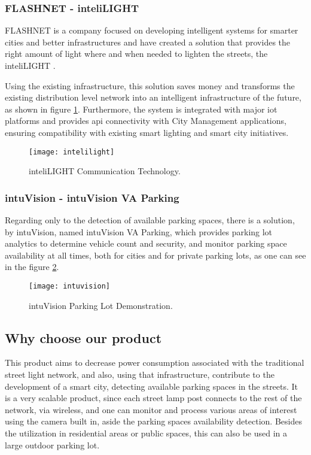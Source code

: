 \subsubsection{FLASHNET - inteliLIGHT}
FLASHNET is a company focused on developing intelligent systems for smarter cities and better infrastructures and have created a solution that provides the right amount of light where and when needed to lighten the streets, the inteliLIGHT \cite{inteli_light}.

Using the existing infrastructure, this solution saves money and transforms the existing distribution level network into an intelligent infrastructure of the future, as shown in figure \ref{fig:intelilight}. Furthermore, the system is integrated with major \ac{iot} platforms and provides \ac{api} connectivity with City Management applications, ensuring compatibility with existing smart lighting and smart city initiatives.

\begin{figure}[ht]
	\centering
	\texttt{[image: intelilight]}
	\caption{inteliLIGHT Communication Technology.}
	\label{fig:intelilight}
\end{figure}

\subsubsection{intuVision - intuVision VA Parking}
Regarding only to the detection of available parking spaces, there is a solution, by intuVision, named intuVision VA Parking, which provides parking lot analytics to determine vehicle count and security, and monitor parking space availability at all times, both for cities and for private parking lots, as one can see in the figure \ref{fig:intuvision}. \cite{parking}

\begin{figure}[ht]
	\centering
	\texttt{[image: intuvision]}
	\caption{intuVision Parking Lot Demonstration.}
	\label{fig:intuvision}
\end{figure}

\subsection{Why choose our product}

This product aims to decrease power consumption associated with the traditional street light network, and also, using that infrastructure, contribute to the development of a smart city, detecting available parking spaces in the streets. It is a very scalable product, since each street lamp post connects to the rest of the network, via wireless, and one can monitor and process various areas of interest using the camera built in, aside the parking spaces availability detection. Besides the utilization in residential areas or public spaces, this can also be used in a large outdoor parking lot.